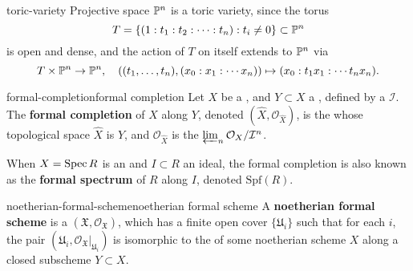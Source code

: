 
\begin{example}{toric-variety}
    Projective space $\mathbb{P}^n$ is a toric variety, since the torus
    \[ T = \{ (1 : t_1 : t_2 : \cdots : t_n) : t_i \ne 0 \} \subset \mathbb{P}^n \]
    is open and dense, and the action of $T$ on itself extends to $\mathbb{P}^n$ via
    \[ T \times \mathbb{P}^n \to \mathbb{P}^n, \quad \left( (t_1, \ldots, t_n), (x_0 : x_1 : \cdots x_n) \right) \mapsto (x_0 : t_1 x_1 : \cdots t_n x_n) . \]
\end{example}

\begin{topic}{formal-completion}{formal completion}
    Let $X$ be a  , and $Y \subset X$ a , defined by a  $\mathcal{I}$. The \textbf{formal completion} of $X$ along $Y$, denoted $(\hat{X}, \mathcal{O}_{\hat{X}})$, is the  whose topological space $\hat{X}$ is $Y$, and $\mathcal{O}_{\hat{X}}$ is the  $\varprojlim_n \mathcal{O}_X / \mathcal{I}^n$.
    
    When $X = \operatorname{Spec} R$ is an  and $I \subset R$ an ideal, the formal completion is also known as the \textbf{formal spectrum} of $R$ along $I$, denoted $\text{Spf}(R)$.
\end{topic}

\begin{topic}{noetherian-formal-scheme}{noetherian formal scheme}
    A \textbf{noetherian formal scheme} is a  $(\mathfrak{X}, \mathcal{O}_\mathfrak{X})$, which has a finite open cover $\{ \mathfrak{U}_i \}$ such that for each $i$, the pair $(\mathfrak{U}_i, \mathcal{O}_\mathfrak{X}|_{\mathfrak{U}_i})$ is isomorphic to the  of some noetherian scheme $X$ along a closed subscheme $Y \subset X$.
\end{topic}

